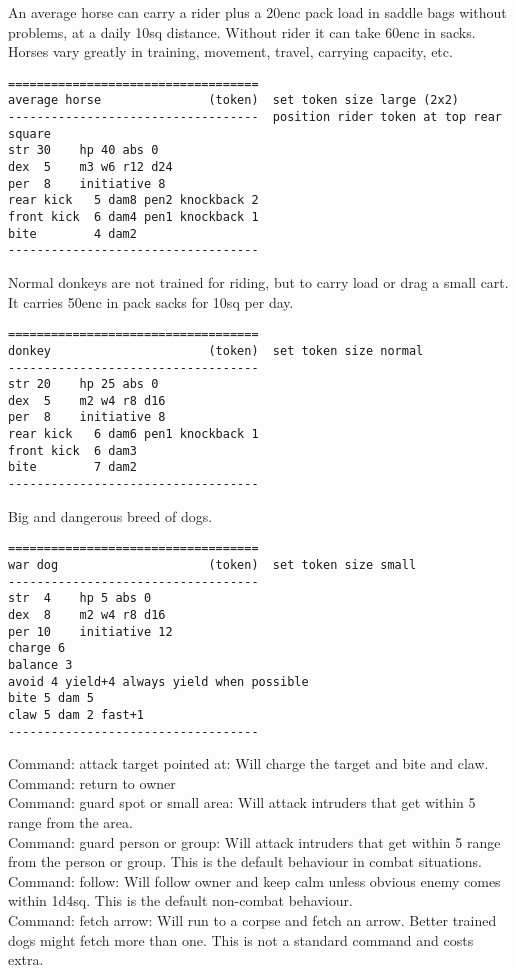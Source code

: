 An average horse can carry a rider plus a 20enc pack load in saddle bags without problems, at a daily 10sq distance. Without rider it can take 60enc in sacks. Horses vary greatly in training, movement, travel, carrying capacity, etc.
\small \begin{samepage} \begin{verbatim}
===================================
average horse               (token)  set token size large (2x2)
-----------------------------------  position rider token at top rear square
str 30    hp 40 abs 0
dex  5    m3 w6 r12 d24
per  8    initiative 8
rear kick   5 dam8 pen2 knockback 2
front kick  6 dam4 pen1 knockback 1
bite        4 dam2
-----------------------------------
\end{verbatim} \end{samepage} \normalsize


Normal donkeys are not trained for riding, but to carry load or drag a small cart. It carries 50enc in pack sacks for 10sq per day.
\small \begin{samepage} \begin{verbatim}
===================================
donkey                      (token)  set token size normal
-----------------------------------
str 20    hp 25 abs 0
dex  5    m2 w4 r8 d16
per  8    initiative 8
rear kick   6 dam6 pen1 knockback 1
front kick  6 dam3
bite        7 dam2
-----------------------------------
\end{verbatim} \end{samepage} \normalsize


Big and dangerous breed of dogs.
\small \begin{samepage} \begin{verbatim}
===================================
war dog                     (token)  set token size small
-----------------------------------
str  4    hp 5 abs 0
dex  8    m2 w4 r8 d16
per 10    initiative 12
charge 6
balance 3
avoid 4 yield+4 always yield when possible
bite 5 dam 5
claw 5 dam 2 fast+1
-----------------------------------
\end{verbatim} \end{samepage} \normalsize
Command: attack target pointed at: Will charge the target and bite and claw. \\
Command: return to owner \\
Command: guard spot or small area: Will attack intruders that get within 5 range from the area. \\
Command: guard person or group: Will attack intruders that get within 5 range from the person or group. This is the default behaviour in combat situations. \\
Command: follow: Will follow owner and keep calm unless obvious enemy comes within 1d4sq. This is the default non-combat behaviour. \\
Command: fetch arrow: Will run to a corpse and fetch an arrow. Better trained dogs might fetch more than one. This is not a standard command and costs extra.


